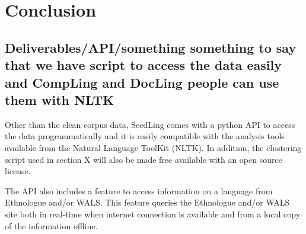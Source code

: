 \documentclass[11pt]{article}
\begin{document}
\newpage
\section{Conclusion}
\subsection{Deliverables/API/something something to say that we have script to access the data easily and CompLing and DocLing people can use them with NLTK}
Other than the clean corpus data, SeedLing comes with a python API to access the data programmatically and it is easily compatible with the analysis tools available from the Natural Language ToolKit (NLTK). In addition, the clustering script used in section X will also be made free available with an open source license.

The API also includes a feature to access information on a language from Ethnologue and/or WALS. This feature queries the Ethnologue and/or WALS site both in real-time when internet connection is available and from a local copy of the information offline. 
\end{document}
